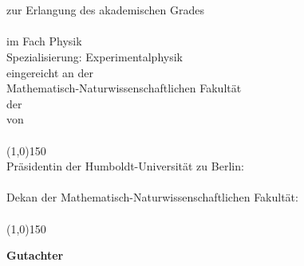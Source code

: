 \cleardoublepage		
\thispagestyle{empty}
{\parskip=0pt
\begin{center}
	\vspace*{1cm}
	\textbf{\LARGE \textsf{\METAtitle}\\ \null}
	\textbf{\large\textsf{\METAdoctype}\\\null}
	zur Erlangung des akademischen Grades \\\null
	\METAdegree\\\null
	im Fach Physik\\
	Spezialisierung: Experimentalphysik \\ \null%
	eingereicht an der \\
	Mathematisch-Naturwissenschaftlichen Fakult\"at \\
	der \METAuniversity \\ \null
	von \\\null
	\textbf{\METAdegreeold~\METAauthor} \\
	\line(1,0){150} \\\null
	Pr\"asidentin der Humboldt-Universit\"at zu Berlin: \\
	\METApresident \\ \null
	Dekan der Mathematisch-Naturwissenschaftlichen Fakult\"at: \\
	\METAdeanf \\
    \line(1,0){150} \\\null
	\begin{flushleft}\textbf{Gutachter}\end{flushleft}
		\begin{flushleft}\hspace*{12mm}\METAsupervisora\dotfill\end{flushleft}
		\begin{flushleft}\hspace*{12mm}\METAsupervisorb\dotfill\end{flushleft}

\end{center}}

